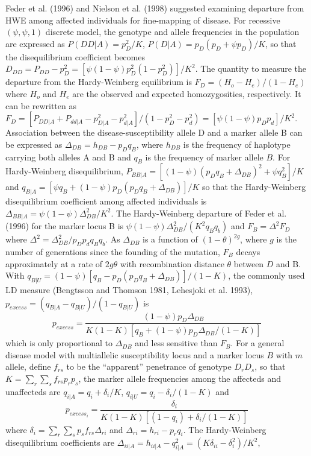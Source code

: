 Feder et al.  (1996) and Nielson et al. (1998) suggested examining departure
from HWE among affected individuals for fine-mapping of disease.  For recessive
$(\psi, \psi, 1)$ discrete model, the genotype and allele frequencies in the
population are expressed as $P(DD|A)=p_D^2/K$, $P(D|A)=p_D(p_D+\psi p_D)/K$, so
that the disequilibrium coefficient becomes
$D_{DD}=P_{DD}-p_D^2=[\psi(1-\psi)p_D^2(1-p_D^2)]/K^2$.  The quantity to
measure the departure from the Hardy-Weinberg equilibrium is
$F_D=(H_o-H_e)/(1-H_e)$ where $H_o$ and $H_e$ are the observed and expected
homozygosities, respectively.  It can be rewritten as
$F_D=[P_{DD|A}+P_{dd|A}-p_{D|A}^2-p_{d|A}^2]/(1-p_D^2-p_d^2)=[
\psi(1-\psi)p_Dp_d]/K^2$.  Association between the disease-susceptibility
allele D and a marker allele B can be expressed as $\Delta_{DB}=h_{DB}-p_Dq_B$,
where $h_{DB}$ is the frequency of haplotype carrying both alleles A and B and
$q_B$ is the frequency of marker allele $B$.  For Hardy-Weinberg
disequilibrium, $P_{BB|A}=[(1-\psi)(p_Dq_B+\Delta_{DB})^2+\psi q_B^2]/K$ and
$q_{B|A}=[\psi q_B+(1-\psi)p_D(p_Dq_B+\Delta_{DB})]/K$ so that the
Hardy-Weinberg disequilibrium coefficient among affected individuals is
$\Delta_{BB|A}=\psi(1-\psi)\Delta_{DB}^2/K^2$.  The Hardy-Weinberg departure of
Feder et al.  (1996) for the marker locus B is
$\psi(1-\psi)\Delta_{DB}^2/(K^2q_Bq_b)$ and $F_B=\Delta^2F_D$ where
$\Delta^2=\Delta_{DB}^2/p_Dp_dq_Bq_b$.  As $\Delta_{DB}$ is a function of
$(1-\theta)^{2g}$, where $g$ is the number of generations since the founding of
the mutation, $F_B$ decays approximately at a rate of $2g\theta$ with
recombination distance $\theta$ between $D$ and B.  With
$q_{B|U}=(1-\psi)[q_B-p_D(p_Dq_B+\Delta_{DB})]/(1-K)$, the commonly used LD
measure (Bengtsson and Thomson 1981, Lehesjoki et al.  1993),
$p_{excess}=(q_{B|A}-q_{B|U})/(1-q_{B|U})$ is
$$p_{excess}=\frac{(1-\psi)p_D\Delta_{DB}}{K(1-K)[q_B+(1-\psi)p_D\Delta_{DB}/(1
-K)]}$$ which is only proportional to $\Delta_{DB}$ and less sensitive than
$F_B$.  For a general disease model with multiallelic susceptibility locus and
a marker locus $B$ with $m$ allele, define $f_{rs}$ to be the ``apparent''
penetrance of genotype $D_rD_s$, so that $K=\sum_r\sum_sf_{rs}p_rp_s$, the
marker allele frequencies among the affecteds and unaffecteds are
$q_{i|A}=q_i+\delta_i/K$, $q_{i|U}=q_i-\delta_i/(1-K)$ and
$$p_{excess_i}=\frac{\delta_i}{K(1-K)[(1-q_i)+\delta_i/(1-K)]}$$ where
$\delta_i=\sum_r\sum_s p_s f_{rs}\Delta_{ri}$ and $\Delta_{ri}=h_{ri}-p_rq_i$.
The Hardy-Weinberg disequilibrium coefficients are
$\Delta_{ii|A}=h_{ii|A}-q_{i|A}^2=(K\delta_{ii}-\delta_i^2)/K^2$,
